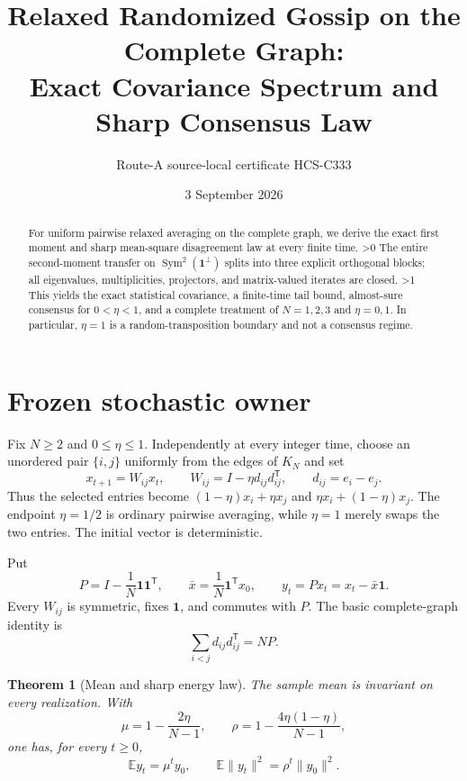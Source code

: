 \documentclass[10pt]{article}
\title{Relaxed Randomized Gossip on the Complete Graph:\\
Exact Covariance Spectrum and Sharp Consensus Law}
\author{Route-A source-local certificate HCS-C333}
\date{3 September 2026}
\providecommand{\CRevisionRound}{2}
\newtheorem{theorem}{Theorem}
\newcommand{\EE}{\mathbb E}
\newcommand{\one}{\mathbf 1}
\begin{document}
\maketitle
\begin{abstract}
For uniform pairwise relaxed averaging on the complete graph, we derive the
exact first moment and sharp mean-square disagreement law at every finite
time.
\ifnum\CRevisionRound>0
The entire second-moment transfer on $\operatorname{Sym}^2(\one^\perp)$
splits into three explicit orthogonal blocks; all eigenvalues,
multiplicities, projectors, and matrix-valued iterates are closed.
\fi
\ifnum\CRevisionRound>1
This yields the exact statistical covariance, a finite-time tail bound,
almost-sure consensus for $0<\eta<1$, and a complete treatment of
$N=1,2,3$ and $\eta=0,1$.  In particular, $\eta=1$ is a random-transposition
boundary and not a consensus regime.
\fi
\end{abstract}

\section{Frozen stochastic owner}
Fix $N\geq2$ and $0\leq\eta\leq1$.  Independently at every integer time,
choose an unordered pair $\{i,j\}$ uniformly from the edges of $K_N$ and set
\begin{equation}\label{eq:update}
 x_{t+1}=W_{ij}x_t,
 \qquad W_{ij}=I-\eta d_{ij}d_{ij}^{\mathsf T},
 \qquad d_{ij}=e_i-e_j.
\end{equation}
Thus the selected entries become
$(1-\eta)x_i+\eta x_j$ and $\eta x_i+(1-\eta)x_j$.
The endpoint $\eta=1/2$ is ordinary pairwise averaging, while $\eta=1$
merely swaps the two entries.  The initial vector is deterministic.

Put
\[
 P=I-\frac1N\one\one^{\mathsf T},\qquad
 \bar x=\frac1N\one^{\mathsf T}x_0,\qquad y_t=Px_t=x_t-\bar x\one.
\]
Every $W_{ij}$ is symmetric, fixes $\one$, and commutes with $P$.
The basic complete-graph identity is
\begin{equation}\label{eq:laplacian}
 \sum_{i<j}d_{ij}d_{ij}^{\mathsf T}=NP.
\end{equation}

\begin{theorem}[Mean and sharp energy law]\label{thm:energy}
The sample mean is invariant on every realization.  With
\begin{equation}\label{eq:mu-rho}
 \mu=1-\frac{2\eta}{N-1},\qquad
 \rho=1-\frac{4\eta(1-\eta)}{N-1},
\end{equation}
one has, for every $t\geq0$,
\begin{equation}\label{eq:first-energy}
 \EE y_t=\mu^t y_0,
 \qquad
 \EE\|y_t\|^2=\rho^t\|y_0\|^2.
\end{equation}
\end{theorem}
\end{document}
